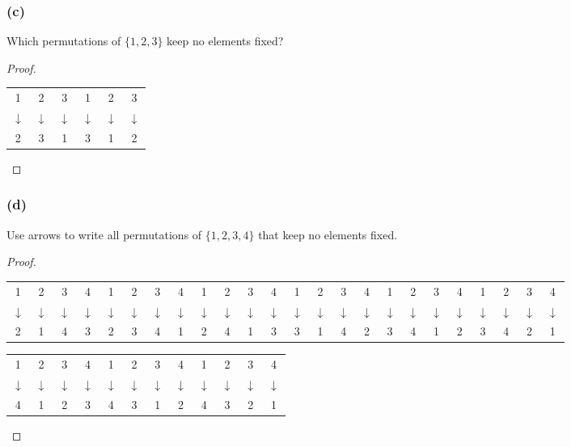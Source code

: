 \documentclass[14pt]{extarticle}
\newcommand{\cyda}{{\cy \(\downarrow\)}}
\newcommand{\cy}{\color{cyan}}
\begin{document}
\subsubsection{(c)}
Which permutations of \(\{1, 2, 3\}\) keep no elements fixed?

\begin{proof}
     \begin{center}
          \begin{tabular}{ccc|ccc}
               1     & 2     & 3     & 1     & 2     & 3     \\
               \cyda & \cyda & \cyda & \cyda & \cyda & \cyda \\
               2     & 3     & 1     & 3     & 1     & 2     \\
          \end{tabular}
     \end{center}
\end{proof}

\subsubsection{(d)}
Use arrows to write all permutations of \(\{1, 2, 3, 4\}\) that keep no elements fixed.

\begin{proof}
     \begin{center}
          \begin{tabular}{cccc|cccc|cccc|cccc|cccc|cccc}
               1     & 2     & 3     & 4     & 1     & 2     & 3     & 4     & 1     & 2     & 3     & 4     & 1     & 2     & 3 & 4 & 1 & 2 & 3 & 4 & 1 & 2 & 3 & 4 \\
               \cyda & \cyda & \cyda & \cyda & \cyda & \cyda & \cyda & \cyda & \cyda & \cyda & \cyda & \cyda & \cyda & \cyda &
               \cyda & \cyda & \cyda & \cyda & \cyda & \cyda & \cyda & \cyda & \cyda & \cyda                                                                         \\
               2     & 1     & 4     & 3     & 2     & 3     & 4     & 1     & 2     & 4     & 1     & 3     & 3     & 1     & 4 & 2 & 3 & 4 & 1 & 2 & 3 & 4 & 2 & 1
          \end{tabular}
     \end{center}
     \begin{center}
          \begin{tabular}{cccc|cccc|cccc}
               1     & 2     & 3     & 4     & 1     & 2     & 3     & 4     & 1     & 2     & 3     & 4     \\
               \cyda & \cyda & \cyda & \cyda & \cyda & \cyda & \cyda & \cyda & \cyda & \cyda & \cyda & \cyda \\
               4     & 1     & 2     & 3     & 4     & 3     & 1     & 2     & 4     & 3     & 2     & 1
          \end{tabular}
     \end{center}
\end{proof}
\end{document}
